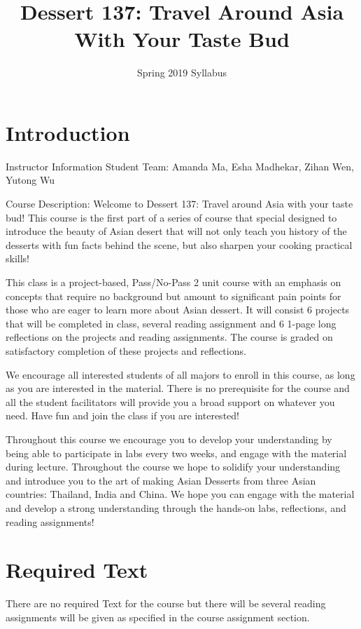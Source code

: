 \documentclass{article}
\title{Dessert 137: Travel Around Asia With Your Taste Bud}
\author{Spring 2019 Syllabus}
\begin{document}
\maketitle

\section*{Introduction}


Instructor Information
{Student Team: Amanda Ma, Esha Madhekar, Zihan Wen, Yutong Wu}

Course Description:
Welcome to Dessert 137: Travel around Asia with your taste bud! This course is the first part of a series of course that special designed to introduce the beauty of Asian desert that will not only teach you history of the desserts with fun facts behind the scene, but also sharpen your cooking practical skills!

This class is a project-based, Pass/No-Pass 2 unit course with an emphasis on concepts that require no background but amount to significant pain points for those who are eager to learn more about Asian dessert. It will consist 6 projects that will be completed in class, several reading assignment and 6 1-page long reflections on the projects and reading assignments. The course is graded on satisfactory completion of these projects and reflections.

We encourage all interested students of all majors to enroll in this course, as long as you are interested in the material. There is no prerequisite for the course and all the student facilitators will provide you a broad support on whatever you need. Have fun and join the class if you are interested!

Throughout this course we encourage you to develop your understanding by being able to participate in labs every two weeks, and engage with the material during lecture. Throughout the course we hope to solidify your understanding and introduce you to the art of making Asian Desserts from three Asian countries: Thailand, India and China. We hope you can engage with the material and develop a strong understanding through the hands-on labs, reflections, and reading assignments!
\section*{Required Text}
There are no required Text for the course but there will be several reading assignments will be given as specified in the course assignment section. 
\end{document}
